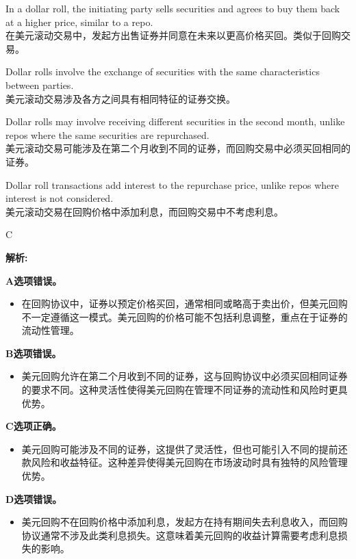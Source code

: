 \documentclass{article}
\newenvironment{explanation}
{\textbf{解析:}\par}
{\par}
\begin{document}
    \begin{choices}
        \item In a dollar roll, the initiating party sells securities and agrees to buy them back at a higher price, similar to a repo.\\
        在美元滚动交易中，发起方出售证券并同意在未来以更高价格买回。类似于回购交易。
        \item Dollar rolls involve the exchange of securities with the same characteristics between parties.\\
        美元滚动交易涉及各方之间具有相同特征的证券交换。
        \item Dollar rolls may involve receiving different securities in the second month, unlike repos where the same securities are repurchased.\\
        美元滚动交易可能涉及在第二个月收到不同的证券，而回购交易中必须买回相同的证券。
        \item Dollar roll transactions add interest to the repurchase price, unlike repos where interest is not considered.\\
        美元滚动交易在回购价格中添加利息，而回购交易中不考虑利息。
    \end{choices}
    
    \begin{correctanswer}
    C
    \end{correctanswer}
    
    \begin{explanation}

        \textbf{A选项错误。}
        \begin{itemize}
            \item 在回购协议中，证券以预定价格买回，通常相同或略高于卖出价，但美元回购不一定遵循这一模式。美元回购的价格可能不包括利息调整，重点在于证券的流动性管理。
        \end{itemize}
        
        \textbf{B选项错误。}
        \begin{itemize}
            \item 美元回购允许在第二个月收到不同的证券，这与回购协议中必须买回相同证券的要求不同。这种灵活性使得美元回购在管理不同证券的流动性和风险时更具优势。
        \end{itemize}
        
        \textbf{C选项正确。}
        \begin{itemize}
            \item 美元回购可能涉及不同的证券，这提供了灵活性，但也可能引入不同的提前还款风险和收益特征。这种差异使得美元回购在市场波动时具有独特的风险管理优势。
        \end{itemize}
        
        \textbf{D选项错误。}
        \begin{itemize}
            \item 美元回购不在回购价格中添加利息，发起方在持有期间失去利息收入，而回购协议通常不涉及此类利息损失。这意味着美元回购的收益计算需要考虑利息损失的影响。
        \end{itemize}
        
        \end{explanation}
    
\end{document}
